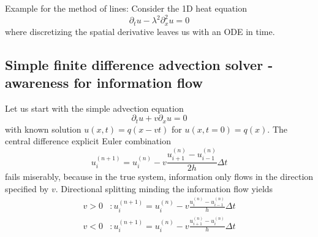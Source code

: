 \textcolor{blue1}{Example for the method of lines: } Consider the 1D heat equation
\begin{equation}
    \partial_t u - \lambda^2 \partial_x^2 u = 0
\end{equation}
where discretizing the spatial derivative leaves us with an ODE in time.

\subsection*{Simple finite difference advection solver - awareness for information flow}
Let us start with the simple advection equation
\begin{equation}
    \partial_t u + v \partial_x u = 0
\end{equation}
with known solution $u(x,t) = q(x - vt)$ for $u(x,t=0) = q(x)$.
\textcolor{red1}{The central difference explicit Euler combination}
\begin{equation}
    u_i^{(n+1)}=u_i^{(n)}-v \frac{u_{i+1}^{(n)}-u_{i-1}^{(n)}}{2 h} \Delta t
\end{equation}
\textcolor{red1}{fails miserably, because in the true system, information
only flows in the direction specified by $v$}. \textcolor{green1}{Directional
splitting minding the information flow yields}
\begin{equation}
    \begin{aligned}
        v > 0&: u_i^{(n+1)} = u_i^{(n)} - v \frac{u_i^{(n)} - u_{i-1}^{(n)}}{h} \Delta t  \\
        v < 0&: u_i^{(n+1)} = u_i^{(n)} - v \frac{u_{i+1}^{(n)} - u_{i}^{(n)}}{h} \Delta t 
    \end{aligned}
\end{equation}
